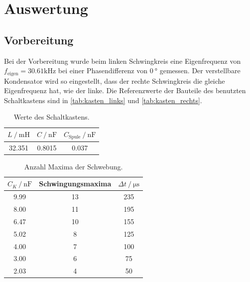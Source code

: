 \section{Auswertung}
\label{sec:Auswertung}

\subsection{Vorbereitung}
Bei der Vorbereitung wurde beim linken Schwingkreis eine Eigenfrequenz von $f_{\text{eigen}}=30.61 \si{\kilo\hertz}$ bei einer
Phasendifferenz von $\SI{0}{\degree}$ gemessen. 
Der verstellbare Kondensator wird so eingestellt, dass der rechte Schwingkreis die gleiche Eigenfrequenz hat, wie der linke.
Die Referenzwerte der Bauteile des benutzten Schaltkastens sind in \autoref{tab:kasten_links} und \autoref{tab:kasten_rechts}.


\begin{table}
  \centering
  \caption{Werte des Schaltkastens.}
  \label{tab:kasten_links}
  \begin{tabular}{c c c}
      \toprule
      {$L \:/\: \si{\milli\henry} $} & $C \:/\: \si{\nano\farad} $ & $C_{\text{Spule}}\:/\: \si{\nano\farad}$ \\
      \midrule
      32.351 & 0.8015 & 0.037 \\
      \bottomrule
  \end{tabular}
\end{table}


\begin{table}
  \centering
  \caption{Anzahl Maxima der Schwebung.}
  \label{tab:schwing_maxima}
  \begin{tabular}{c c c}
      \toprule
      {$C_K \:/\: \si{\nano\farad}$} & Schwingungsmaxima & $\Delta t\:/\: \si{\micro\second}$ \\
      \midrule
      9.99  & 13 & 235 \\ 
      8.00  & 11 & 195 \\ 
      6.47  & 10 & 155 \\ 
      5.02 & 8 & 125 \\ 
      4.00 & 7 & 100 \\
      3.00 & 6 & 75 \\
      2.03 & 4 & 50\\ 
      \bottomrule
  \end{tabular}
\end{table}

